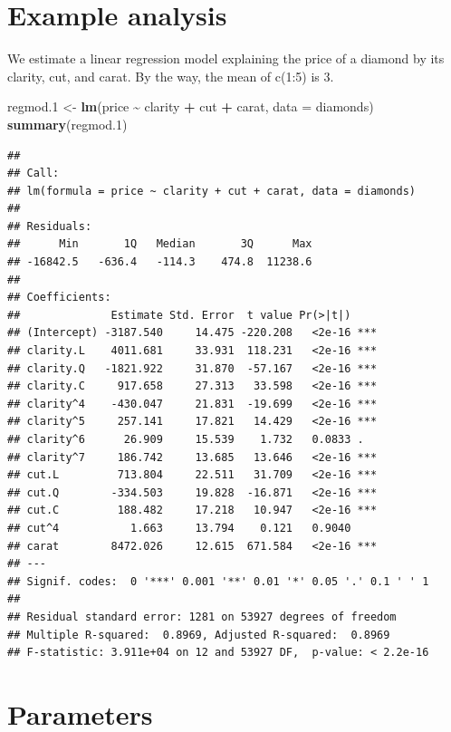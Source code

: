\documentclass[
]{article}
\newenvironment{Shaded}{\begin{snugshade}}{\end{snugshade}}
\newcommand{\AttributeTok}[1]{\textcolor[rgb]{0.13,0.29,0.53}{#1}}
\newcommand{\FloatTok}[1]{\textcolor[rgb]{0.00,0.00,0.81}{#1}}
\newcommand{\FunctionTok}[1]{\textcolor[rgb]{0.13,0.29,0.53}{\textbf{#1}}}
\newcommand{\NormalTok}[1]{#1}
\newcommand{\OtherTok}[1]{\textcolor[rgb]{0.56,0.35,0.01}{#1}}
\newcommand{\SpecialCharTok}[1]{\textcolor[rgb]{0.81,0.36,0.00}{\textbf{#1}}}
\begin{document}
\section{Example analysis}\label{example-analysis}

We estimate a linear regression model explaining the price of a diamond
by its clarity, cut, and carat. By the way, the mean of c(1:5) is 3.

\begin{Shaded}
\begin{Highlighting}[]
\NormalTok{regmod}\FloatTok{.1} \OtherTok{\textless{}{-}} \FunctionTok{lm}\NormalTok{(price }\SpecialCharTok{\textasciitilde{}}\NormalTok{ clarity }\SpecialCharTok{+}\NormalTok{ cut }\SpecialCharTok{+}\NormalTok{ carat, }\AttributeTok{data =}\NormalTok{ diamonds)}
\FunctionTok{summary}\NormalTok{(regmod}\FloatTok{.1}\NormalTok{) }
\end{Highlighting}
\end{Shaded}

\begin{verbatim}
## 
## Call:
## lm(formula = price ~ clarity + cut + carat, data = diamonds)
## 
## Residuals:
##      Min       1Q   Median       3Q      Max 
## -16842.5   -636.4   -114.3    474.8  11238.6 
## 
## Coefficients:
##              Estimate Std. Error  t value Pr(>|t|)    
## (Intercept) -3187.540     14.475 -220.208   <2e-16 ***
## clarity.L    4011.681     33.931  118.231   <2e-16 ***
## clarity.Q   -1821.922     31.870  -57.167   <2e-16 ***
## clarity.C     917.658     27.313   33.598   <2e-16 ***
## clarity^4    -430.047     21.831  -19.699   <2e-16 ***
## clarity^5     257.141     17.821   14.429   <2e-16 ***
## clarity^6      26.909     15.539    1.732   0.0833 .  
## clarity^7     186.742     13.685   13.646   <2e-16 ***
## cut.L         713.804     22.511   31.709   <2e-16 ***
## cut.Q        -334.503     19.828  -16.871   <2e-16 ***
## cut.C         188.482     17.218   10.947   <2e-16 ***
## cut^4           1.663     13.794    0.121   0.9040    
## carat        8472.026     12.615  671.584   <2e-16 ***
## ---
## Signif. codes:  0 '***' 0.001 '**' 0.01 '*' 0.05 '.' 0.1 ' ' 1
## 
## Residual standard error: 1281 on 53927 degrees of freedom
## Multiple R-squared:  0.8969, Adjusted R-squared:  0.8969 
## F-statistic: 3.911e+04 on 12 and 53927 DF,  p-value: < 2.2e-16
\end{verbatim}

\section{Parameters}\label{parameters}
\end{document}
